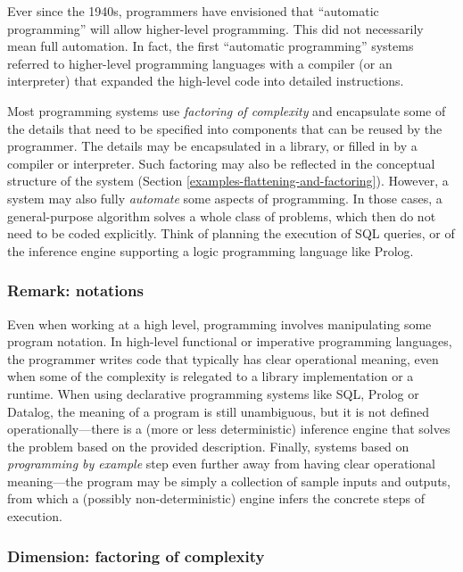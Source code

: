 \documentclass[english,submission]{programming}
\begin{document}
Ever since the 1940s, programmers have envisioned that ``automatic
programming'' will allow higher-level programming. This did not
necessarily mean full automation. In fact, the first ``automatic
programming'' systems referred to higher-level programming languages
with a compiler (or an interpreter) that expanded the high-level code
into detailed instructions.

Most programming systems use \emph{factoring of complexity} and
encapsulate some of the details that need to be specified into
components that can be reused by the programmer. The details may be
encapsulated in a library, or filled in by a compiler or interpreter.
Such factoring may also be reflected in the conceptual structure of the
system (Section \ref{examples-flattening-and-factoring}). However, a
system may also fully \emph{automate} some aspects of programming. In
those cases, a general-purpose algorithm solves a whole class of
problems, which then do not need to be coded explicitly. Think of
planning the execution of SQL queries, or of the inference engine
supporting a logic programming language like Prolog.

\hypertarget{remark-notations}{%
\subsubsection{Remark: notations}\label{remark-notations}}

Even when working at a high level, programming involves manipulating
some program notation. In high-level functional or imperative
programming languages, the programmer writes code that typically has
clear operational meaning, even when some of the complexity is relegated
to a library implementation or a runtime. When using declarative
programming systems like SQL, Prolog or Datalog, the meaning of a
program is still unambiguous, but it is not defined
operationally---there is a (more or less deterministic) inference engine
that solves the problem based on the provided description. Finally,
systems based on \emph{programming by example} step even further away
from having clear operational meaning---the program may be simply a
collection of sample inputs and outputs, from which a (possibly
non-deterministic) engine infers the concrete steps of execution.

\hypertarget{dimension-factoring-of-complexity}{%
\subsubsection{Dimension: factoring of
complexity}\label{dimension-factoring-of-complexity}}
\end{document}
